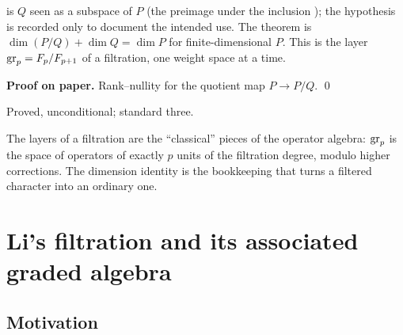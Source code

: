 \begin{dictionary}
 is $Q$ seen as a subspace of $P$ (the preimage under the inclusion
); the hypothesis  is recorded only to document the intended use. The
theorem is $\dim(P/Q)+\dim Q = \dim P$ for finite-dimensional $P$. This is the layer $\operatorname{gr}_p =
F_p/F_{p+1}$ of a filtration, one weight space at a time.
\end{dictionary}

\textbf{Proof on paper.} Rank--nullity for the quotient map $P\to P/Q$. \qed

\begin{status}
Proved, unconditional; standard three.
\end{status}

\begin{physics}
The layers of a filtration are the ``classical'' pieces of the operator algebra: $\operatorname{gr}_p$ is the
space of operators of exactly $p$ units of the filtration degree, modulo higher corrections. The
dimension identity is the bookkeeping that turns a filtered character into an ordinary one.
\end{physics}


\section{Li's filtration and its associated graded algebra}\label{l11:sec:li}

\subsection{Motivation}

